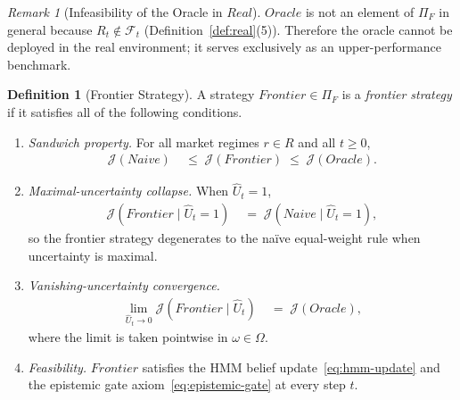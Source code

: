 \documentclass[12pt,openany]{book}
\numberwithin{equation}{chapter}
\theoremstyle{plain}
\theoremstyle{definition}
\newtheorem{definition}[theorem]{Definition}
\theoremstyle{remark}
\newtheorem{remark}[theorem]{Remark}
\numberwithin{equation}{chapter}
\theoremstyle{plain}
\newcommand{\Real}{\mathcal{E}_{R}}
\newcommand{\Naive}{N}
\newcommand{\Oracle}{O}
\newcommand{\Frontier}{F}
\newcommand{\calR}{\mathcal{R}}
\def\Naive{Naive}%
\def\Oracle{Oracle}%
\def\Real{Real}%
\def\Frontier{Frontier}%
\def\calR{R}%
\begin{document}
\begin{remark}[Infeasibility of the Oracle in $\Real$]
\label{rem:oracle-infeasible}
$\Oracle$ is not an element of $\Pi_F$ in general because
$R_t \notin \mathcal{F}_t$ (Definition~\ref{def:real}(5)).
Therefore the oracle cannot be deployed in the real environment;
it serves exclusively as an upper-performance benchmark.
\end{remark}

\begin{definition}[Frontier Strategy]
\label{def:frontier}
A strategy $\Frontier \in \Pi_F$ is a \emph{frontier strategy}
if it satisfies all of the following conditions.
\begin{enumerate}
  \item \emph{Sandwich property.}  For all market regimes
        $r \in \calR$ and all $t \geq 0$,
        \begin{align}
          \mathcal{J}(\Naive)
          &\;\leq\;
          \mathcal{J}(\Frontier)
          \;\leq\;
          \mathcal{J}(\Oracle).
          \label{eq:frontier-sandwich}
        \end{align}
  \item \emph{Maximal-uncertainty collapse.}
        When $\hat{U}_t = 1$,
        \begin{align}
          \mathcal{J}(\Frontier \mid \hat{U}_t = 1)
          &\;=\;
          \mathcal{J}(\Naive \mid \hat{U}_t = 1),
          \label{eq:frontier-maxU}
        \end{align}
        so the frontier strategy degenerates to the na\"{i}ve
        equal-weight rule when uncertainty is maximal.
  \item \emph{Vanishing-uncertainty convergence.}
        \begin{align}
          \lim_{\hat{U}_t \to 0}
          \mathcal{J}(\Frontier \mid \hat{U}_t)
          &\;=\;
          \mathcal{J}(\Oracle),
          \label{eq:frontier-zeroU}
        \end{align}
        where the limit is taken pointwise in $\omega \in \Omega$.
  \item \emph{Feasibility.}
        $\Frontier$ satisfies the HMM belief
        update~\eqref{eq:hmm-update} and the epistemic gate
        axiom~\eqref{eq:epistemic-gate} at every step $t$.
\end{enumerate}
\end{definition}
\end{document}
